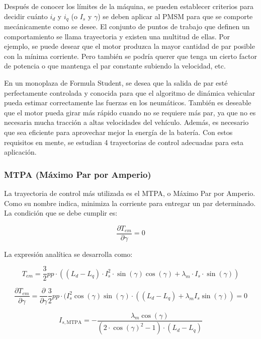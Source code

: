 Después de conocer los límites de la máquina, se pueden establecer criterios para decidir cuánto \(i_d\) y \(i_q\) (o \(I_s\) y \(\gamma\)) se deben aplicar al PMSM para que se comporte mecánicamente como se desee. El conjunto de puntos de trabajo que definen un comportamiento se llama trayectoria y existen una multitud de ellas. Por ejemplo, se puede desear que el motor produzca la mayor cantidad de par posible con la mínima corriente. Pero también se podría querer que tenga un cierto factor de potencia o que mantenga el par constante subiendo la velocidad, etc.

En un monoplaza de Formula Student, se desea que la salida de par esté perfectamente controlada y conocida para que el algoritmo de dinámica vehicular pueda estimar correctamente las fuerzas en los neumáticos. También es deseable que el motor pueda girar más rápido cuando no se requiere más par, ya que no es necesaria mucha tracción a altas velocidades del vehículo. Además, es necesario que sea eficiente para aprovechar mejor la energía de la batería. Con estos requisitos en mente, se estudian 4 trayectorias de control adecuadas para esta aplicación.

\subsubsection{MTPA (Máximo Par por Amperio)}

La trayectoria de control más utilizada es el MTPA, o Máximo Par por Amperio. Como su nombre indica, minimiza la corriente para entregar un par determinado. La condición que se debe cumplir es:

\begin{equation}
	\frac{\partial T_{em}}{\partial \gamma} = 0
\end{equation}


La expresión analítica se desarrolla como:

\begin{equation}
	T_{em} = \frac{3}{2}pp\cdot((L_d - L_q)\cdot I_s^2 \cdot \sin(\gamma)\cos(\gamma) + \lambda_m\cdot I_s\cdot \sin(\gamma))
\end{equation}


\begin{equation}
\frac{\partial T_{em}}{\partial \gamma} = \frac{\partial}{\partial \gamma} \frac{3}{2}pp\cdot(I_s^2 \cos(\gamma)\sin(\gamma)\cdot((L_d - L_q) + \lambda_m I_s \sin(\gamma)) = 0
\end{equation}

\begin{equation}
I_{s,\text{MTPA}} = -\frac{\lambda_m \cos(\gamma)}{(2\cdot\cos(\gamma)^2 - 1)\cdot(L_d-L_q)}
\end{equation}

